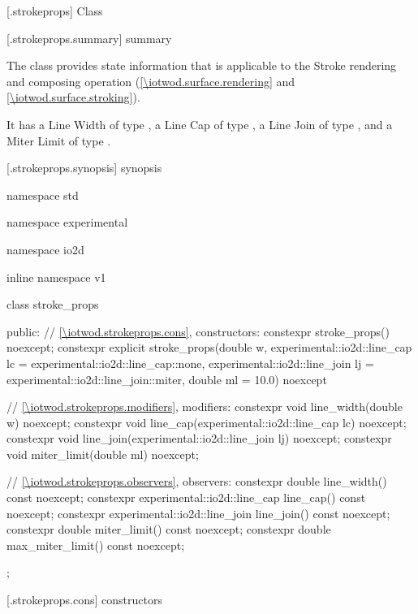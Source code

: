 
 [\iotwod.strokeprops] {Class }

 [\iotwod.strokeprops.summary] { summary}

\pnum
The  class provides state information that is applicable to the Stroke rendering and composing operation (\ref{\iotwod.surface.rendering} and \ref{\iotwod.surface.stroking}).

\pnum
It has a Line Width of type , a Line Cap of type , a Line Join of type , and a Miter Limit of type .

%
 [\iotwod.strokeprops.synopsis] { synopsis}

\begin{codeblock}
namespace std { namespace experimental { namespace io2d { inline namespace v1 {
  class stroke_props {
  public:
    // \ref{\iotwod.strokeprops.cons}, constructors:
    constexpr stroke_props() noexcept;
    constexpr explicit stroke_props(double w,
      experimental::io2d::line_cap lc = experimental::io2d::line_cap::none,
      experimental::io2d::line_join lj = experimental::io2d::line_join::miter,
      double ml = 10.0) noexcept    

    // \ref{\iotwod.strokeprops.modifiers}, modifiers:
    constexpr void line_width(double w) noexcept;
    constexpr void line_cap(experimental::io2d::line_cap lc) noexcept;
    constexpr void line_join(experimental::io2d::line_join lj) noexcept;
    constexpr void miter_limit(double ml) noexcept;
    
    // \ref{\iotwod.strokeprops.observers}, observers:
    constexpr double line_width() const noexcept;
    constexpr experimental::io2d::line_cap line_cap() const noexcept;
    constexpr experimental::io2d::line_join line_join() const noexcept;
    constexpr double miter_limit() const noexcept;
    constexpr double max_miter_limit() const noexcept;
  };
}}}}
\end{codeblock}

 [\iotwod.strokeprops.cons] { constructors}

